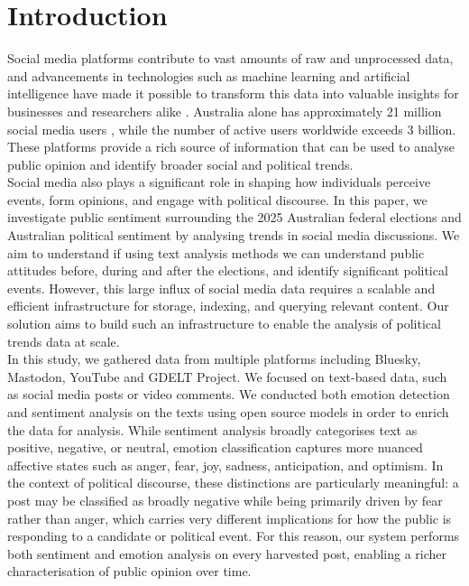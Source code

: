 \section{Introduction}

Social media platforms contribute to vast amounts of raw and unprocessed data, and advancements in technologies such as machine learning and artificial intelligence have made it possible to transform this data into valuable insights for businesses and researchers alike \cite{sivarajah2017critical}. Australia alone has approximately 21 million social media users \cite{fiber2026social}, while the number of active users worldwide exceeds 3 billion. These platforms provide a rich source of information that can be used to analyse public opinion and identify broader social and political trends.
\\

Social media also plays a significant role in shaping how individuals perceive events, form opinions, and engage with political discourse. In this paper, we investigate public sentiment surrounding the 2025 Australian federal elections and Australian political sentiment by analysing trends in social media discussions. We aim to understand if using text analysis methods we can understand public attitudes before, during and after the elections, and identify significant political events. However, this large influx of social media data requires a scalable and efficient infrastructure for storage, indexing, and querying relevant content. Our solution aims to build such an infrastructure to enable the analysis of political trends data at scale.
\\

In this study, we gathered data from multiple platforms including Bluesky, Mastodon, YouTube and GDELT Project. We focused on text-based data, such as social media posts or video comments. We conducted both emotion detection and sentiment analysis on the texts using open source models in order to enrich the data for analysis. While sentiment analysis broadly categorises text as positive, negative, or neutral, emotion classification captures more nuanced affective states such as anger, fear, joy, sadness, anticipation, and optimism. In the context of political discourse, these distinctions are particularly meaningful: a post may be classified as broadly negative while being primarily driven by fear rather than anger, which carries very different implications for how the public is responding to a candidate or political event. For this reason, our system performs both sentiment and emotion analysis on every harvested post, enabling a richer characterisation of public opinion over time.
\\

